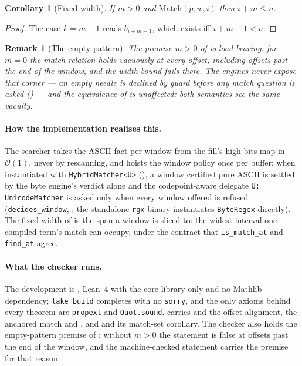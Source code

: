 \documentclass[11pt,letterpaper]{article}
\newtheorem{corollary}{Corollary}
\newtheorem{remark}{Remark}
\begin{document}
\begin{corollary}[Fixed width]
\label{cor:width}
If $m>0$ and $\mathrm{Match}(p,w,i)$ then $i+m\le n$.
\end{corollary}

\begin{proof}
The case $k=m-1$ reads $b_{i+m-1}$, which exists iff $i+m-1<n$.
\end{proof}

\begin{remark}[The empty pattern]
\label{rem:empty}
The premise $m>0$ of  is load-bearing: for $m=0$ the
match relation holds vacuously at every offset, including offsets past the
end of the window, and the width bound fails there. The engines never
expose that corner --- an empty needle is declined by guard before any
match question is asked () --- and
the equivalence of  is unaffected: both semantics see the
same vacuity.
\end{remark}

\paragraph{How the implementation realises this.}
The searcher takes the ASCII fact per window from the fill's high-bits
map in $\mathcal{O}(1)$, never by rescanning, and hoists the window
policy once per buffer; when instantiated with \texttt{HybridMatcher<U>}
(), a window certified pure ASCII is
settled by the byte engine's verdict alone and the codepoint-aware delegate
\texttt{U: UnicodeMatcher} is asked only when every window offered is
refused (\texttt{decides\_window}, ;
the standalone \texttt{rgx} binary instantiates \texttt{ByteRegex} directly).
The fixed width of  is the span a window is sliced to: the
widest interval one compiled term's match can occupy, under the contract
that \texttt{is\_match\_at} and \texttt{find\_at} agree.

\paragraph{What the checker runs.}
The development is , Lean~4 with the core library only and no
Mathlib dependency; \texttt{lake build} completes with no \texttt{sorry},
and the only axioms behind every theorem are \texttt{propext} and
\texttt{Quot.sound}.  carries
 and the offset alignment,
 the anchored match and
, and 
 and its match-set corollary. The checker also holds the
empty-pattern premise of : without $m>0$ the statement is
false at offsets past the end of the window, and the machine-checked
statement carries the premise for that reason.
\end{document}
